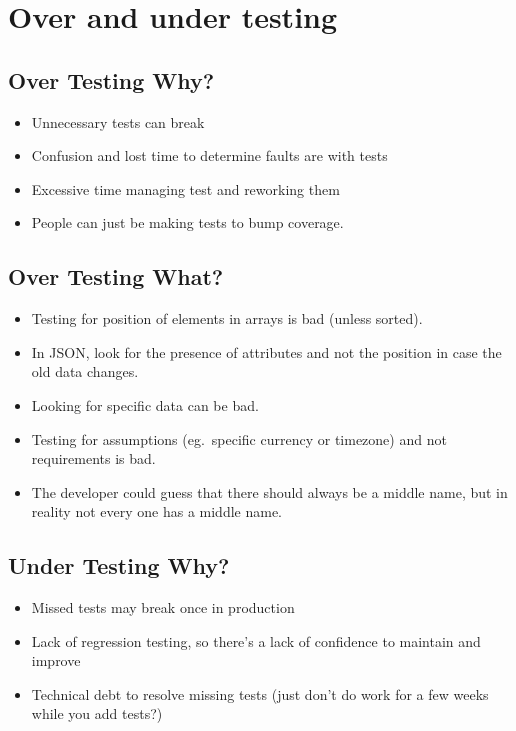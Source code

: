\section{Over and under testing}\label{sec:over_and_under_testing}

\subsection{Over Testing Why?}\label{sub:over_testing_why_}

\begin{itemize}
	\item Unnecessary tests can break
	\item Confusion and lost time to determine faults are with tests
	\item Excessive time managing test and reworking them
	\item People can just be making tests to bump coverage.
\end{itemize}

\subsection{Over Testing What?}\label{sub:over_testing_what_}

\begin{itemize}
	\item Testing for position of elements in arrays is bad (unless sorted).
	\item In JSON, look for the presence of attributes and not the position in case the old data changes.
	\item Looking for specific data can be bad.
	\item Testing for assumptions (eg.\ specific currency or timezone) and not requirements is bad.
	\item The developer could guess that there should always be a middle name, but in reality not every one has a middle name.
\end{itemize}

\subsection{Under Testing Why?}\label{sub:under_testing_why_}

\begin{itemize}
	\item Missed tests may break once in production
	\item Lack of regression testing, so there's a lack of confidence to maintain and improve
	\item Technical debt to resolve missing tests (just don't do work for a few weeks while you add tests?)
\end{itemize}

